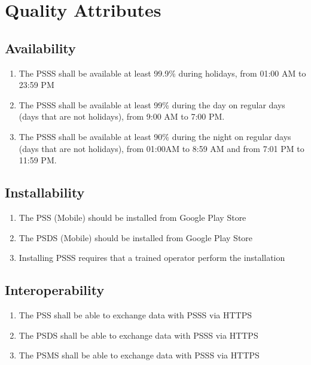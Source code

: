 \section{Quality Attributes}
\subsection{Availability}
\begin{enumerate}[label=SEC-\arabic*]
    \item The PSSS shall be available at least 99.9\% during holidays, 
    from 01:00 AM to 23:59 PM
    \item The PSSS shall be available at least 99\% during the day on regular 
    days (days that are not holidays), from 9:00 AM to 7:00 PM.
    \item The PSSS shall be available at least 90\% during 
    the night on regular days (days that are not holidays), from 
    01:00AM to 8:59 AM and from 7:01 PM to 11:59 PM.
\end{enumerate}

\subsection{Installability}
\begin{enumerate}[label=SEC-\arabic*]
    \item The PSS (Mobile) should be installed from Google Play Store
    \item The PSDS (Mobile) should be installed from Google Play Store
    \item Installing PSSS requires that a trained operator perform 
    the installation
\end{enumerate}

\subsection{Interoperability}
\begin{enumerate}[label=SEC-\arabic*]
    \item The PSS shall be able to exchange data with PSSS via HTTPS
    \item The PSDS shall be able to exchange data with PSSS via HTTPS
    \item The PSMS shall be able to exchange data with PSSS via HTTPS
\end{enumerate}

